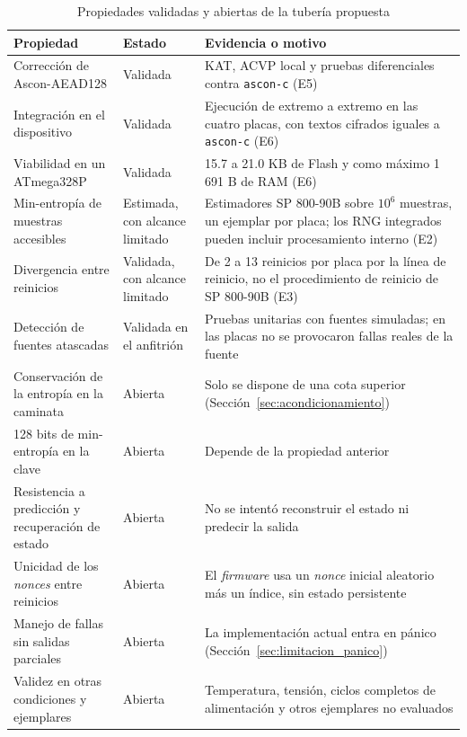 \begin{table}[H]
\centering
\caption{Propiedades validadas y abiertas de la tubería propuesta}
\label{tab:propiedades}
\small
\begin{tabularx}{\textwidth}{@{}L{0.32\textwidth}L{0.13\textwidth}Y@{}}
\toprule
\textbf{Propiedad} & \textbf{Estado} & \textbf{Evidencia o motivo} \\
\midrule
Corrección de Ascon-AEAD128 & Validada & KAT, ACVP local y pruebas diferenciales contra \texttt{ascon-c} (E5) \\
Integración en el dispositivo & Validada & Ejecución de extremo a extremo en las cuatro placas, con textos cifrados iguales a \texttt{ascon-c} (E6) \\
Viabilidad en un ATmega328P & Validada & 15.7 a 21.0 KB de Flash y como máximo 1\,691 B de RAM (E6) \\
Min-entropía de muestras accesibles & Estimada, con alcance limitado & Estimadores SP 800-90B sobre $10^6$ muestras, un ejemplar por placa; los RNG integrados pueden incluir procesamiento interno (E2) \\
Divergencia entre reinicios & Validada, con alcance limitado & De 2 a 13 reinicios por placa por la línea de reinicio, no el procedimiento de reinicio de SP 800-90B (E3) \\
Detección de fuentes atascadas & Validada en el anfitrión & Pruebas unitarias con fuentes simuladas; en las placas no se provocaron fallas reales de la fuente \\
Conservación de la entropía en la caminata & Abierta & Solo se dispone de una cota superior (Sección~\ref{sec:acondicionamiento}) \\
128 bits de min-entropía en la clave & Abierta & Depende de la propiedad anterior \\
Resistencia a predicción y recuperación de estado & Abierta & No se intentó reconstruir el estado ni predecir la salida \\
Unicidad de los \textit{nonces} entre reinicios & Abierta & El \textit{firmware} usa un \textit{nonce} inicial aleatorio más un índice, sin estado persistente \\
Manejo de fallas sin salidas parciales & Abierta & La implementación actual entra en pánico (Sección~\ref{sec:limitacion_panico}) \\
Validez en otras condiciones y ejemplares & Abierta & Temperatura, tensión, ciclos completos de alimentación y otros ejemplares no evaluados \\
\bottomrule
\end{tabularx}
\end{table}


